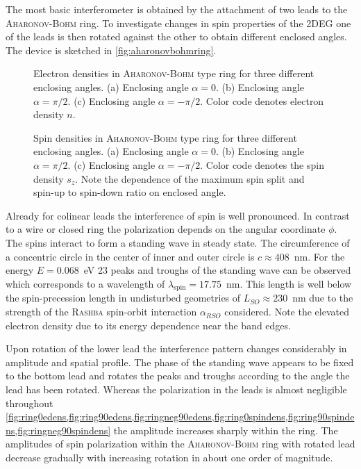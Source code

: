 The most basic interferometer is obtained by the attachment of two leads to the \textsc{Aharonov-Bohm} ring. To investigate changes in spin properties of the 2DEG one of the leads is then rotated against the other to obtain different enclosed angles. The device is sketched in \cref{fig:aharonovbohmring}.\par
\begin{figure}[h!]
  \caption{Electron densities in \textsc{Aharonov-Bohm} type ring for three different enclosing angles. (a) Enclosing angle $\alpha=0$. (b) Enclosing angle $\alpha=\pi/2$. (c) Enclosing angle $\alpha=-\pi/2$. Color code denotes electron density $n$.} 
\end{figure}
\begin{figure}[h!]
  \caption{Spin densities in \textsc{Aharonov-Bohm} type ring for three different enclosing angles. (a) Enclosing angle $\alpha=0$. (b) Enclosing angle $\alpha=\pi/2$. (c) Enclosing angle $\alpha=-\pi/2$. Color code denotes the spin density $s_z$. Note the dependence of the maximum spin split and spin-up to spin-down ratio on enclosed angle.}
\end{figure}
Already for colinear leads the interference of spin is well pronounced. In contrast to a wire or closed ring \cite{PhysRevB.82.165322} the polarization depends on the angular coordinate $\phi$.
The spins interact to form a standing wave in steady state. The circumference of a concentric circle in the center of inner and outer circle is $c\approx 408$~nm. For the energy $E=0.068$~eV 23 peaks and troughs of the standing wave can be observed which corresponds to a wavelength of $\lambda_{\text{spin}}=17.75$~nm. This length is well below the spin-precession length in undisturbed geometries of $L_{SO}\approx230$~nm due to the strength of the \textsc{Rashba} spin-orbit interaction $\alpha_{RSO}$ considered. Note the elevated electron density due to its energy dependence near the band edges.\par
Upon rotation of the lower lead the interference pattern changes considerably in amplitude and spatial profile. The phase of the standing wave appears to be fixed to the bottom lead and rotates the peaks and troughs according to the angle the lead has been rotated. Whereas the polarization in the leads is almost negligible throughout \cref{fig:ring0edens,fig:ring90edens,fig:ringneg90edens,fig:ring0spindens,fig:ring90spindens,fig:ringneg90spindens} the amplitude increases sharply within the ring. The amplitudes of spin polarization within the \textsc{Aharonov-Bohm} ring with rotated lead decrease gradually with increasing rotation in about one order of magnitude.\par
